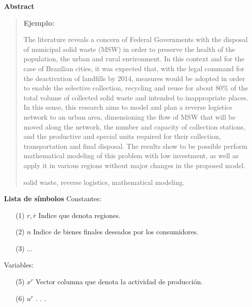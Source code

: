 \newpage
\begin{center}
 {\bf\LARGE Abstract}\vskip 1.5cm
\end{center} 
\begin{quotation}

{\bf Ejemplo:}\par

The literature reveals a concern of Federal Governments with the disposal of municipal solid waste (MSW) in order to preserve the health of the population, the urban and rural environment. In this context and for the case of Brazilian cities, it was expected that, with the legal command for the deactivation of landfills by 2014, measures would be adopted in order to enable the selective collection, recycling and reuse for about $80\%$ of the total volume of collected solid waste and intended to inappropriate places. 
\vskip 0.2cm
In this sense, this research aims to model and plan a reverse logistics network to an urban area, dimensioning the flow of MSW that will be moved along the network, the number and capacity of collection stations, and the productive and special units required for their collection, transportation and final disposal. The results show to be possible perform mathematical modeling of this problem with low investment, as well as apply it in various regions without major changes in the proposed model.

\vskip 0.3cm
\hspace*{-0.6cm}{\bf Keywords:} solid waste, reverse logistics, mathematical modeling.
\end{quotation}


\newpage
{}
 {\bf\LARGE Lista de símbolos}
 \vskip 1.5cm
Constantes: 
\begin{enumerate}
\item[(1)]$r,\overline{r} $ \hspace*{0.8cm} Indice que denota regiones.
\item[(2)] $n $ \hspace*{1.1cm} Indice de bienes finales deseados por los consumidores.
\item[(3)] ...
\vskip 3cm
\end{enumerate} 
\vskip 0.3cm
Variables:
\begin{enumerate}
\item[(5)] $ x^{r} $ \hspace*{1cm} Vector columna que denota la actividad de producción.
\item[(6)] $ u^{r} $ \hspace*{1.2cm} . . .
\end{enumerate}
